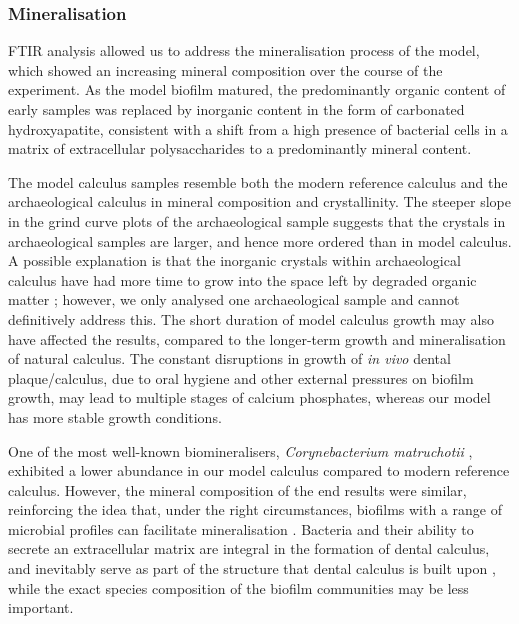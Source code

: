 \documentclass[10pt,a4paper]{article}
\begin{document}
\subsubsection*{Mineralisation}\label{mineralisation}

FTIR analysis allowed us to address the mineralisation process of the
model, which showed an increasing mineral composition over the course of
the experiment. As the model biofilm matured, the predominantly organic
content of early samples was replaced by inorganic content in the form
of carbonated hydroxyapatite, consistent with a shift from a high
presence of bacterial cells in a matrix of extracellular polysaccharides
\citep{jainIsolationCharacterization2013, sutherlandBiofilmMatrix2001, zhangMeasurementPolysaccharides1998}
to a predominantly mineral content.

The model calculus samples resemble both the modern reference calculus
and the archaeological calculus in mineral composition and
crystallinity. The steeper slope in the grind curve plots of the
archaeological sample suggests that the crystals in archaeological
samples are larger, and hence more ordered than in model calculus. A
possible explanation is that the inorganic crystals within
archaeological calculus have had more time to grow into the space left
by degraded organic matter \citep{weinerBiologicalMaterials2010};
however, we only analysed one archaeological sample and cannot
definitively address this. The short duration of model calculus growth
may also have affected the results, compared to the longer-term growth
and mineralisation of natural calculus. The constant disruptions in
growth of \emph{in vivo} dental plaque/calculus, due to oral hygiene and
other external pressures on biofilm growth, may lead to multiple stages
of calcium phosphates, whereas our model has more stable growth
conditions.

One of the most well-known biomineralisers, \emph{Corynebacterium
matruchotii}
\citep{enneverCharacterizationBacterionema1978, takazoeCalciumHydroxyapatite1970},
exhibited a lower abundance in our model calculus compared to modern
reference calculus. However, the mineral composition of the end results
were similar, reinforcing the idea that, under the right circumstances,
biofilms with a range of microbial profiles can facilitate
mineralisation \citep{moorerCalcificationCariogenic1993}. Bacteria and
their ability to secrete an extracellular matrix are integral in the
formation of dental calculus, and inevitably serve as part of the
structure that dental calculus is built upon
\citep{rohanizadehUltrastructuralStudy2005}, while the exact species
composition of the biofilm communities may be less important.
\end{document}
